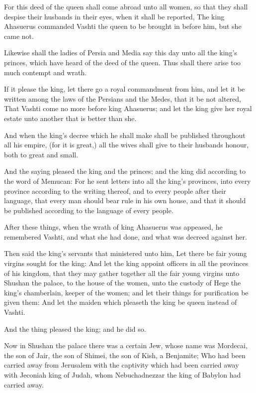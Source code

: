 \Verse For this deed of the queen shall come abroad unto all women, so that they shall despise their husbands in their eyes, when it shall be reported, The king Ahasuerus commanded Vashti the queen to be brought in before him, but she came not.

\Verse Likewise shall the ladies of Persia and Media say this day unto all the king's princes, which have heard of the deed of the queen.  Thus shall there arise too much contempt and wrath.

\Verse If it please the king, let there go a royal commandment from him, and let it be written among the laws of the Persians and the Medes, that it be not altered, That Vashti come no more before king Ahasuerus; and let the king give her royal estate unto another that is better than she.

\Verse And when the king's decree which he shall make shall be published throughout all his empire, (for it is great,) all the wives shall give to their husbands honour, both to great and small.

\Verse And the saying pleased the king and the princes; and the king did according to the word of Memucan: \Verse For he sent letters into all the king's provinces, into every province according to the writing thereof, and to every people after their language, that every man should bear rule in his own house, and that it should be published according to the language of every people.


\Chapter
\Verse After these things, when the wrath of king Ahasuerus was appeased, he remembered Vashti, and what she had done, and what was decreed against her.

\Verse Then said the king's servants that ministered unto him, Let there be fair young virgins sought for the king: \Verse And let the king appoint officers in all the provinces of his kingdom, that they may gather together all the fair young virgins unto Shushan the palace, to the house of the women, unto the custody of Hege the king's chamberlain, keeper of the women; and let their things for purification be given them: \Verse And let the maiden which pleaseth the king be queen instead of Vashti.

And the thing pleased the king; and he did so.

\Verse Now in Shushan the palace there was a certain Jew, whose name was Mordecai, the son of Jair, the son of Shimei, the son of Kish, a Benjamite; \Verse Who had been carried away from Jerusalem with the captivity which had been carried away with Jeconiah king of Judah, whom Nebuchadnezzar the king of Babylon had carried away.


